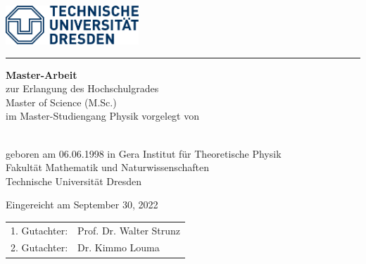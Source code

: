 \makeatletter
\thispagestyle{empty}
\begin{titlepage}
  \includegraphics[width=5cm]{figs/logo.pdf}
  \vspace{1em}
  \hrule

  {\centering {} \vspace*{5em} {\bfseries\Huge \@title}
    \vfill \vfill
    {\large {\bfseries Master-Arbeit} \\
      zur Erlangung des Hochschulgrades\\
      Master of Science (M.Sc.)\\
      im Master-Studiengang Physik}
    \vfill vorgelegt von \vspace{1em}

  {{\large \@author} \\
  geboren am 06.06.1998 in Gera}
  \vfill
  {\large Institut f\"ur Theoretische Physik\\
    Fakultät Mathematik und Naturwissenschaften\\
    Technische Universität Dresden \\}
}

\clearpage
\thispagestyle{empty}
\null\vfill
{\large Eingereicht am September 30, 2022}

\begin{tabular*}{.5\linewidth}[h]{ll}
  1. Gutachter: & Prof. Dr. Walter Strunz \\
  2. Gutachter: & Dr. Kimmo Louma \\
\end{tabular*}
\end{titlepage}
\makeatother
